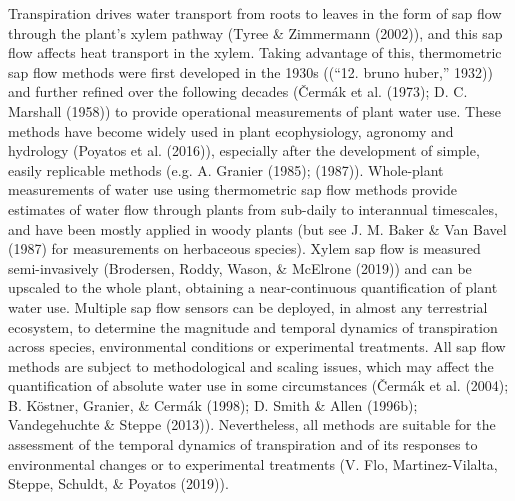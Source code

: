 \documentclass[11pt,twoside]{reedthesis}
\begin{document}
Transpiration drives water transport from roots to leaves in the form of
sap flow through the plant's xylem pathway (Tyree \& Zimmermann (2002)),
and this sap flow affects heat transport in the xylem. Taking advantage
of this, thermometric sap flow methods were first developed in the 1930s
((``12. bruno huber,'' 1932)) and further refined over the following
decades (Čermák et al. (1973); D. C. Marshall (1958)) to provide
operational measurements of plant water use. These methods have become
widely used in plant ecophysiology, agronomy and hydrology (Poyatos et
al. (2016)), especially after the development of simple, easily
replicable methods (e.g. A. Granier (1985); (1987)). Whole-plant
measurements of water use using thermometric sap flow methods provide
estimates of water flow through plants from sub-daily to interannual
timescales, and have been mostly applied in woody plants (but see J. M.
Baker \& Van Bavel (1987) for measurements on herbaceous species). Xylem
sap flow is measured semi-invasively (Brodersen, Roddy, Wason, \&
McElrone (2019)) and can be upscaled to the whole plant, obtaining a
near-continuous quantification of plant water use. Multiple sap flow
sensors can be deployed, in almost any terrestrial ecosystem, to
determine the magnitude and temporal dynamics of transpiration across
species, environmental conditions or experimental treatments. All sap
flow methods are subject to methodological and scaling issues, which may
affect the quantification of absolute water use in some circumstances
(Čermák et al. (2004); B. Köstner, Granier, \& Cermák (1998); D. Smith
\& Allen (1996b); Vandegehuchte \& Steppe (2013)). Nevertheless, all
methods are suitable for the assessment of the temporal dynamics of
transpiration and of its responses to environmental changes or to
experimental treatments (V. Flo, Martinez-Vilalta, Steppe, Schuldt, \&
Poyatos (2019)).\par
\end{document}
